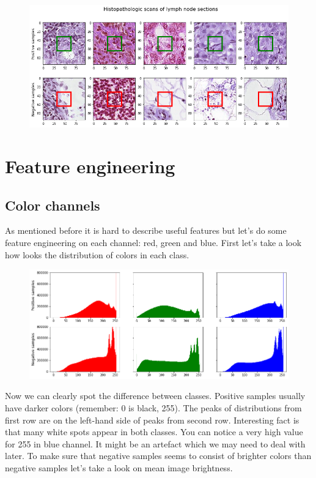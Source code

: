\documentclass[12pt, a4paper]{article}
\begin{document}
\begin{figure}[ht]
	\centering
	\includegraphics[width =16cm]{scans.png}
\end{figure}

\section{Feature engineering}

\subsection*{Color channels}

\noindent
As mentioned before it is hard to describe useful features but let's do some feature engineering on each channel: red, green and blue. First let's take a look how looks the distribution of colors in each class.

\begin{figure}[ht]
	\centering
	\includegraphics[width =16cm]{color_channels.png}
\end{figure}

\noindent
Now we can clearly spot the difference between classes. Positive samples usually have darker colors (remember: 0 is black, 255). The peaks of distributions from first row are on the left-hand side of peaks from second row. Interesting fact is that many white spots appear in both classes. You can notice a very high value for 255 in blue channel. It might be an artefact which we may need to deal with later. To make sure that negative samples seems to consist of brighter colors than negative samples let's take a look on mean image brightness.
\end{document}
